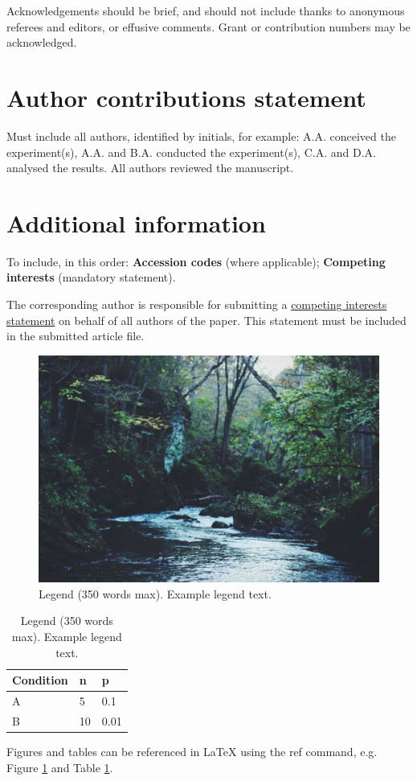 \documentclass[fleqn,10pt]{wlscirep}
\begin{document}
Acknowledgements should be brief, and should not include thanks to anonymous referees and editors, or effusive comments. Grant or contribution numbers may be acknowledged.

\section*{Author contributions statement}

Must include all authors, identified by initials, for example:
A.A. conceived the experiment(s),  A.A. and B.A. conducted the experiment(s), C.A. and D.A. analysed the results.  All authors reviewed the manuscript. 

\section*{Additional information}

To include, in this order: \textbf{Accession codes} (where applicable); \textbf{Competing interests} (mandatory statement). 

The corresponding author is responsible for submitting a \href{http://www.nature.com/srep/policies/index.html#competing}{competing interests statement} on behalf of all authors of the paper. This statement must be included in the submitted article file.

\begin{figure}[ht]
\centering
\includegraphics[width=\linewidth]{stream}
\caption{Legend (350 words max). Example legend text.}
\label{fig:stream}
\end{figure}

\begin{table}[ht]
\centering
\begin{tabular}{|l|l|l|}
\hline
Condition & n & p \\
\hline
A & 5 & 0.1 \\
\hline
B & 10 & 0.01 \\
\hline
\end{tabular}
\caption{\label{tab:example}Legend (350 words max). Example legend text.}
\end{table}

Figures and tables can be referenced in LaTeX using the ref command, e.g. Figure \ref{fig:stream} and Table \ref{tab:example}.
\end{document}
